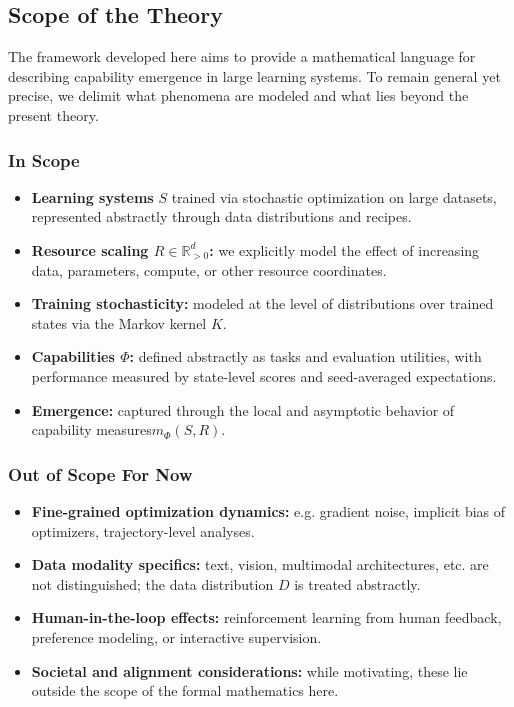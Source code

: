 \documentclass[12pt]{article}
\begin{document}
\subsection{Scope of the Theory}

The framework developed here aims to provide a mathematical language for describing capability emergence in large learning systems. To remain general yet precise, we delimit what phenomena are modeled and what lies beyond the present theory.

\subsubsection{In Scope}

\begin{itemize}
    \item \textbf{Learning systems} $S$ trained via stochastic optimization on large datasets, represented abstractly through data distributions and recipes.
    \item \textbf{Resource scaling $R \in \mathbb R^d_{>0}$:} we explicitly model the effect of increasing data, parameters, compute, or other resource coordinates.
    \item \textbf{Training stochasticity:} modeled at the level of distributions over trained states via the Markov kernel $K$.
    \item \textbf{Capabilities $\Phi$:} defined abstractly as tasks and evaluation utilities, with performance measured by state-level scores and seed-averaged expectations.
    \item \textbf{Emergence:} captured through the local and asymptotic behavior of capability measures$m_\Phi(S,R)$.
\end{itemize}

\subsubsection{Out of Scope For Now}

\begin{itemize}
    \item \textbf{Fine-grained optimization dynamics:} e.g. gradient noise, implicit bias of optimizers, trajectory-level analyses.
    \item \textbf{Data modality specifics:} text, vision, multimodal architectures, etc. are not distinguished; the data distribution $D$ is treated abstractly.
    \item \textbf{Human-in-the-loop effects:} reinforcement learning from human feedback, preference modeling, or interactive supervision.
    \item \textbf{Societal and alignment considerations:} while motivating, these lie outside the scope of the formal mathematics here.
\end{itemize}
\end{document}
